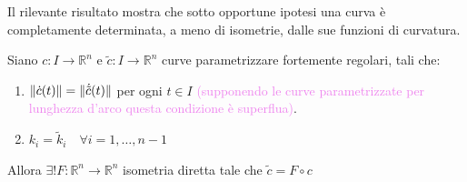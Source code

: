         \newpage
        Il rilevante risultato mostra che sotto opportune ipotesi una curva è completamente determinata, a meno di isometrie, dalle sue funzioni di curvatura.
        \begin{teorema}
        \label{th:curva_univocamente_determinata_a_meno_di_isometrie}
        Siano $c \colon I \to \mathbb{R}^n$ e $\tilde{c} \colon I \to \mathbb{R}^n$ curve parametrizzare fortemente regolari, tali che:
        \begin{enumerate}
            \item $\lVert\dot{c}(t)\rVert = \lVert\dot{\tilde{c}}(t)\rVert$ per ogni $t \in I$ \textcolor{violet}{(supponendo le curve parametrizzate per lunghezza d'arco questa condizione è superflua)}.
            \item $k_i = \tilde{k}_i \quad \forall i=1, \dots, n-1$
        \end{enumerate}
        Allora $\exists ! F \colon \mathbb{R}^n \to \mathbb{R}^n$ isometria diretta tale che $\tilde{c} = F \circ c$
        \end{teorema}
